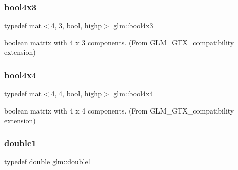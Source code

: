 \subsubsection{\texorpdfstring{bool4x3}{bool4x3}}
{\footnotesize\ttfamily typedef \mbox{\hyperlink{structglm_1_1mat}{mat}}$<$4, 3, bool, \mbox{\hyperlink{namespaceglm_a36ed105b07c7746804d7fdc7cc90ff25ac6f7eab42eacbb10d59a58e95e362074}{highp}}$>$ \mbox{\hyperlink{group__gtx__compatibility_gab1a5519fb12e67d9940fa4d9b4590198}{glm\+::bool4x3}}}



boolean matrix with 4 x 3 components. (From G\+L\+M\+\_\+\+G\+T\+X\+\_\+compatibility extension) 

\mbox{\label{group__gtx__compatibility_ga568a1c97a6c6f7253334ee5933a6cb77}} 
\subsubsection{\texorpdfstring{bool4x4}{bool4x4}}
{\footnotesize\ttfamily typedef \mbox{\hyperlink{structglm_1_1mat}{mat}}$<$4, 4, bool, \mbox{\hyperlink{namespaceglm_a36ed105b07c7746804d7fdc7cc90ff25ac6f7eab42eacbb10d59a58e95e362074}{highp}}$>$ \mbox{\hyperlink{group__gtx__compatibility_ga568a1c97a6c6f7253334ee5933a6cb77}{glm\+::bool4x4}}}



boolean matrix with 4 x 4 components. (From G\+L\+M\+\_\+\+G\+T\+X\+\_\+compatibility extension) 

\mbox{\label{group__gtx__compatibility_gab8b88350212cea916857cb2f49b8a29f}} 
\subsubsection{\texorpdfstring{double1}{double1}}
{\footnotesize\ttfamily typedef double \mbox{\hyperlink{group__gtx__compatibility_gab8b88350212cea916857cb2f49b8a29f}{glm\+::double1}}}



